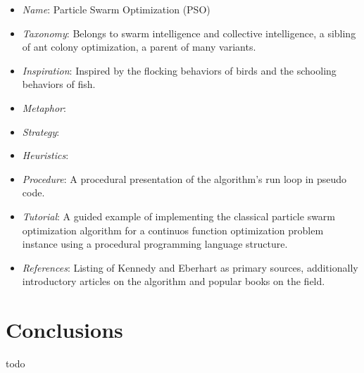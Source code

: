 \documentclass[a4paper, 11pt]{article}
\begin{document}
\begin{itemize}
	\item \emph{Name}: Particle Swarm Optimization (PSO)
	\item \emph{Taxonomy}: Belongs to swarm intelligence and collective intelligence, a sibling of ant colony optimization, a parent of many variants.
	\item \emph{Inspiration}: Inspired by the flocking behaviors of birds and the schooling behaviors of fish.
	\item \emph{Metaphor}: 
	\item \emph{Strategy}: 
	\item \emph{Heuristics}: 
	\item \emph{Procedure}: A procedural presentation of the algorithm's run loop in pseudo code.
	\item \emph{Tutorial}: A guided example of implementing the classical particle swarm optimization algorithm for a continuos function optimization problem instance using a procedural programming language structure.
	\item \emph{References}: Listing of Kennedy and Eberhart as primary sources, additionally introductory articles on the algorithm and popular books on the field.
\end{itemize}

\section{Conclusions}
\label{sec:conclusions}
todo



\end{document}

